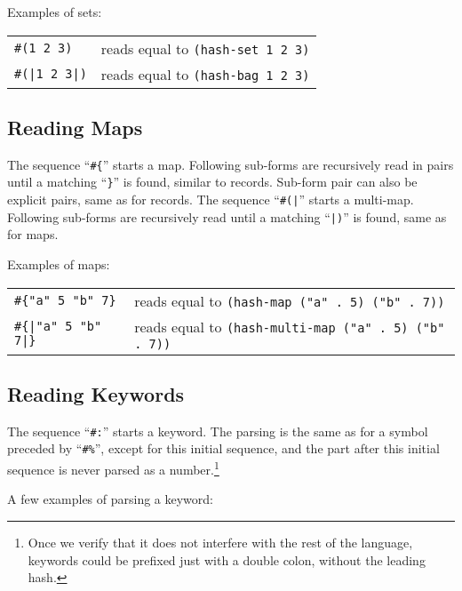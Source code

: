 \example Examples of sets:

\begin{tabular}{ l l }
  \lstinline!#(1 2 3)! & reads equal to \lstinline!(hash-set 1 2 3)! \\
  \lstinline!#(|1 2 3|)! & reads equal to \lstinline!(hash-bag 1 2 3)! \\
\end{tabular}





\subsection{Reading Maps}
\label{subsec:aml-base-lang-reader-maps}

The sequence ``\lstinline!#{!'' starts a map. Following sub-forms are recursively read in pairs until a matching ``\lstinline!}!'' is found, similar to records. Sub-form pair can also be explicit pairs, same as for records. The sequence ``\lstinline!#(|!'' starts a multi-map. Following sub-forms are recursively read until a matching ``\lstinline!|)!'' is found, same as for maps.

\example Examples of maps:

\begin{tabular}{ l l }
  \lstinline!#{"a" 5 "b" 7}! & reads equal to \lstinline!(hash-map ("a" . 5) ("b" . 7))! \\
  \lstinline!#{|"a" 5 "b" 7|}! & reads equal to \lstinline!(hash-multi-map ("a" . 5) ("b" . 7))! \\
\end{tabular}





\subsection{Reading Keywords}
\label{subsec:aml-base-lang-reader-keywords}

The sequence ``\lstinline!#:!'' starts a keyword. The parsing is the same as for a symbol preceded by ``\lstinline!#%!'', except for this initial sequence, and the part after this initial sequence is never parsed as a number.\footnote{Once we verify that it does not interfere with the rest of the language, keywords could be prefixed just with a double colon, without the leading hash.}

\example A few examples of parsing a keyword:

